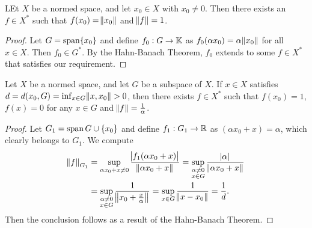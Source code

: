 \begin{cor}
LEt $X$ be a normed space, and let $x_0 \in X$ with $x_0 \neq 0$. 
Then there exists an $f \in X^\ast$ such that $f(x_0) = \norm{x_0}$ and 
$\norm{f} = 1$. 
\end{cor}
\begin{proof}
Let $G = \operatorname{span} \{x_0\}$ and define $f_0: G \to \mathbb{K}$ as $f_0(\alpha x_0) 
= \alpha \norm{x_0}$ for all $x \in X$. 
Then $f_0 \in G^\ast$. 
By the Hahn-Banach Theorem, $f_0$ extends to some $f \in X^\ast$ that 
satisfies our requirement. 
\end{proof}

\begin{cor}
Let $X$ be a normed space, and let $G$ be a subspace of $X$. 
If $x \in X$ satisfies $d = d(x_0, G) = \inf_{x \in G} \norm{x, x_0} > 0$, 
then there exists $f \in X^\ast$ such that $f(x_0) = 1$, $f(x) = 0$ for any
$x \in G$ and $\norm{f} = \frac{1}{\alpha}$. 
\end{cor}
\begin{proof}
Let $G_1 = \operatorname{span} G \cup \{x_0\}$ and define $f_1: G_1 \to \mathbb{R}$ as 
$(\alpha x_0 + x) = \alpha$, which clearly belongs to $G_1$. 
We compute 
\begin{equation*}
    \begin{aligned}
        \norm{f}_{G_1} &= \sup_{\alpha x_0 + x \neq 0} 
        \frac{\abs{f_1(\alpha x_0 + x)}}{\norm{\alpha x_0 + x}} 
        = \sup_{\substack{\alpha \neq 0 \\ x \in G}} \frac{\abs{\alpha}}{\norm{\alpha x_0 + x}} \\
        &= \sup_{\substack{\alpha \neq 0 \\ x \in G}} \frac{1}{\norm{x_0 + \frac{x}{\alpha}}} 
        = \sup_{x \in G} \frac{1}{\norm{x - x_0}} = \frac{1}{d}. 
    \end{aligned}
\end{equation*}
Then the conclusion follows as a result of the Hahn-Banach Theorem.
\end{proof}

